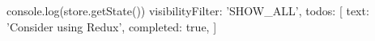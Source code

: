 console.log(store.getState())
{
  visibilityFilter: 'SHOW_ALL',
  todos: [{
      text: 'Consider using Redux',
      completed: true,
    }]
}
